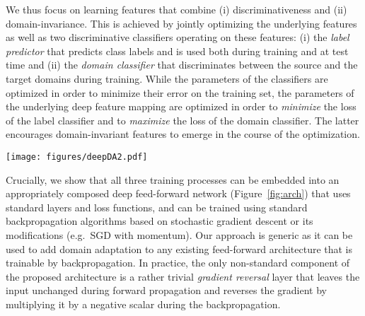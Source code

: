 \documentclass{article}
\newcommand{\fig}[1]{Figure~\ref{fig:#1}}
\begin{document}
We thus focus on learning features that combine (i) discriminativeness and (ii) domain-invariance. This is achieved by jointly optimizing the underlying features as well as two discriminative classifiers operating on these features: (i) the \emph{label predictor} that predicts class labels and is used both during training and at test time and (ii) the \emph{domain classifier} that discriminates between the source and the target domains during training. While the parameters of the classifiers are optimized in order to minimize their error on the training set, the parameters of the underlying deep feature mapping are optimized in order to {\em minimize} the loss of the label classifier and to {\em maximize} the loss of the domain classifier. The latter encourages domain-invariant features to emerge in the course of the optimization.

\begin{figure*}

\centering
\texttt{[image: figures/deepDA2.pdf]}

\caption{The {\bf proposed architecture} includes a deep {\em feature extractor} (green) and a deep {\em label predictor} (blue), which together form a standard feed-forward architecture. Unsupervised domain adaptation is achieved by adding a {\em domain classifier} (red) connected to the feature extractor via a {\em gradient reversal layer} that multiplies the gradient by a certain negative constant during the backpropagation-based training. Otherwise, the training proceeds in a standard way and minimizes the label prediction loss (for source examples) and the domain classification loss (for all samples). Gradient reversal ensures that the feature distributions over the two domains are made similar (as indistinguishable as possible for the domain classifier), thus resulting in the domain-invariant features.\vspace{-2mm}}
\label{fig:arch}
\end{figure*}


Crucially, we show that all three training processes can be embedded into an appropriately composed deep feed-forward network (\fig{arch}) that uses standard layers and loss functions, and can be trained using standard backpropagation algorithms based on stochastic gradient descent or its modifications (e.g.\ SGD with momentum). Our approach is generic as it can be used to add domain adaptation to any existing feed-forward architecture that is trainable by backpropagation. In practice, the only non-standard component of the proposed architecture is a rather trivial {\em gradient reversal} layer that leaves the input unchanged during forward propagation and reverses the gradient by multiplying it by a negative scalar during the backpropagation.  
\end{document}

